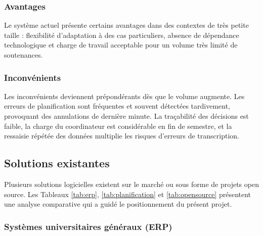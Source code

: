\documentclass[12pt,a4paper]{article}
\begin{document}
\subsubsection{Avantages}
\label{subsubsec:avantages}

Le système actuel présente certains avantages dans des contextes de très petite
taille : flexibilité d'adaptation à des cas particuliers, absence de dépendance
technologique et charge de travail acceptable pour un volume très limité de
soutenances.

\subsubsection{Inconvénients}
\label{subsubsec:inconvenients}

Les inconvénients deviennent prépondérants dès que le volume augmente. Les
erreurs de planification sont fréquentes et souvent détectées tardivement,
provoquant des annulations de dernière minute. La traçabilité des décisions est
faible, la charge du coordinateur est considérable en fin de semestre, et la
ressaisie répétée des données multiplie les risques d'erreurs de transcription.

\subsection{Solutions existantes}
\label{subsec:solutions_existantes}

Plusieurs solutions logicielles existent sur le marché ou sous forme de projets
open source. Les Tableaux \ref{tab:erp}, \ref{tab:planification} et \ref{tab:opensource} présentent une
analyse comparative qui a guidé le positionnement du présent projet.

\subsubsection{Systèmes universitaires généraux (ERP)}
\label{subsubsec:erp}
\end{document}
